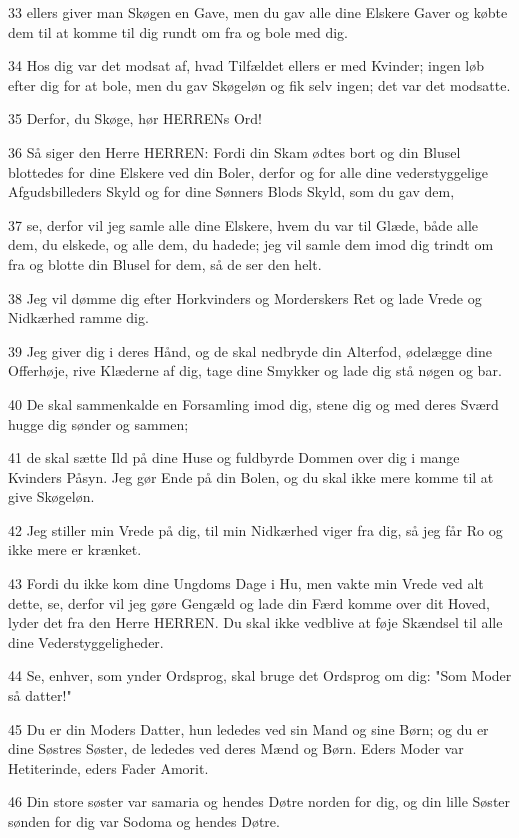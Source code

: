 \par 33 ellers giver man Skøgen en Gave, men du gav alle dine Elskere Gaver og købte dem til at komme til dig rundt om fra og bole med dig.
\par 34 Hos dig var det modsat af, hvad Tilfældet ellers er med Kvinder; ingen løb efter dig for at bole, men du gav Skøgeløn og fik selv ingen; det var det modsatte.
\par 35 Derfor, du Skøge, hør HERRENs Ord!
\par 36 Så siger den Herre HERREN: Fordi din Skam ødtes bort og din Blusel blottedes for dine Elskere ved din Boler, derfor og for alle dine vederstyggelige Afgudsbilleders Skyld og for dine Sønners Blods Skyld, som du gav dem,
\par 37 se, derfor vil jeg samle alle dine Elskere, hvem du var til Glæde, både alle dem, du elskede, og alle dem, du hadede; jeg vil samle dem imod dig trindt om fra og blotte din Blusel for dem, så de ser den helt.
\par 38 Jeg vil dømme dig efter Horkvinders og Morderskers Ret og lade Vrede og Nidkærhed ramme dig.
\par 39 Jeg giver dig i deres Hånd, og de skal nedbryde din Alterfod, ødelægge dine Offerhøje, rive Klæderne af dig, tage dine Smykker og lade dig stå nøgen og bar.
\par 40 De skal sammenkalde en Forsamling imod dig, stene dig og med deres Sværd hugge dig sønder og sammen;
\par 41 de skal sætte Ild på dine Huse og fuldbyrde Dommen over dig i mange Kvinders Påsyn. Jeg gør Ende på din Bolen, og du skal ikke mere komme til at give Skøgeløn.
\par 42 Jeg stiller min Vrede på dig, til min Nidkærhed viger fra dig, så jeg får Ro og ikke mere er krænket.
\par 43 Fordi du ikke kom dine Ungdoms Dage i Hu, men vakte min Vrede ved alt dette, se, derfor vil jeg gøre Gengæld og lade din Færd komme over dit Hoved, lyder det fra den Herre HERREN. Du skal ikke vedblive at føje Skændsel til alle dine Vederstyggeligheder.
\par 44 Se, enhver, som ynder Ordsprog, skal bruge det Ordsprog om dig: "Som Moder så datter!"
\par 45 Du er din Moders Datter, hun lededes ved sin Mand og sine Børn; og du er dine Søstres Søster, de lededes ved deres Mænd og Børn. Eders Moder var Hetiterinde, eders Fader Amorit.
\par 46 Din store søster var samaria og hendes Døtre norden for dig, og din lille Søster sønden for dig var Sodoma og hendes Døtre.
